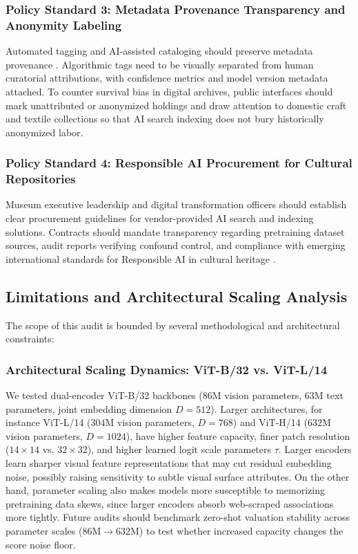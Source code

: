 \documentclass[pdflatex,sn-mathphys-num]{sn-jnl}%
\theoremstyle{thmstyleone}%
\theoremstyle{thmstyletwo}%
\theoremstyle{thmstylethree}%
\begin{document}
\subsubsection{Policy Standard 3: Metadata Provenance Transparency and Anonymity Labeling}
Automated tagging and AI-assisted cataloging should preserve metadata provenance \cite{mitchell2019model, dignum2019responsible}. Algorithmic tags need to be visually separated from human curatorial attributions, with confidence metrics and model version metadata attached. To counter survival bias in digital archives, public interfaces should mark unattributed or anonymized holdings and draw attention to domestic craft and textile collections so that AI search indexing does not bury historically anonymized labor.

\subsubsection{Policy Standard 4: Responsible AI Procurement for Cultural Repositories}
Museum executive leadership and digital transformation officers should establish clear procurement guidelines for vendor-provided AI search and indexing solutions. Contracts should mandate transparency regarding pretraining dataset sources, audit reports verifying confound control, and compliance with emerging international standards for Responsible AI in cultural heritage \cite{dignum2019responsible, jobin2019global}.

\subsection{Limitations and Architectural Scaling Analysis}
\label{sec:limitations_scaling}
The scope of this audit is bounded by several methodological and architectural constraints:

\subsubsection{Architectural Scaling Dynamics: ViT-B/32 vs. ViT-L/14}
We tested dual-encoder ViT-B/32 backbones ($86\text{M}$ vision parameters, $63\text{M}$ text parameters, joint embedding dimension $D=512$). Larger architectures, for instance ViT-L/14 ($304\text{M}$ vision parameters, $D=768$) and ViT-H/14 ($632\text{M}$ vision parameters, $D=1024$), have higher feature capacity, finer patch resolution ($14 \times 14$ vs. $32 \times 32$), and higher learned logit scale parameters $\tau$. Larger encoders learn sharper visual feature representations that may cut residual embedding noise, possibly raising sensitivity to subtle visual surface attributes. On the other hand, parameter scaling also makes models more susceptible to memorizing pretraining data skews, since larger encoders absorb web-scraped associations more tightly. Future audits should benchmark zero-shot valuation stability across parameter scales ($86\text{M} \to 632\text{M}$) to test whether increased capacity changes the score noise floor.
\end{document}
